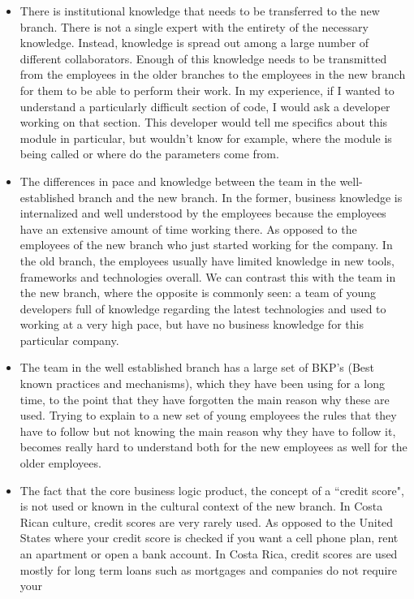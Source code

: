 \documentclass[12pt, letterpaper]{article}
\begin{document}
\begin{itemize}
  \item There is institutional knowledge that needs to be transferred to the new branch. There is not a single expert with  the 		  entirety of the necessary knowledge. Instead, knowledge is spread out among a 
  large number of different collaborators. Enough of this knowledge needs to be transmitted from the employees in the 
  older branches to the employees in the new 
  branch for them to be able to perform their work. In my experience, if I wanted to understand a particularly difficult
  section of code, I would ask a developer working on that section. This developer would tell me specifics about this 
  module in particular, but wouldn't know for example, where the module is being called or where do the parameters come
  from.
  \item The differences in pace and knowledge between the team in the well-established branch and the new branch.
  In the former, business knowledge is internalized and well understood by the employees 
  because the employees have an extensive amount of time working there. As opposed to the employees of the new
  branch who just started working for the company. 
  In the old branch, the employees usually have limited knowledge in new tools, 
  frameworks and technologies overall. We can contrast this with the team in the new branch, where the opposite is
  commonly seen: a team of young developers full of knowledge regarding the latest technologies and used to working at a 
  very high pace, but have no business knowledge for this particular company. 
  \item The team in the well established branch has a large set of BKP's (Best known practices and mechanisms), 
  which they have been using for a long time, to the point that they have forgotten the main reason
  why these are used. Trying to explain to a new set of young employees the rules that they have to follow but not
  knowing the main reason why they have to follow it, becomes really hard to understand both for the new employees
  as well for the older employees.
  \item The fact that the core business logic product, the concept of a ``credit score", is not used or known in the 
  cultural context of the new branch. In Costa Rican culture, credit scores are very rarely used. As opposed to the 
  United States where your credit score is checked if you want a cell phone plan, rent an apartment or open a bank account.
  In Costa Rica, credit scores are used mostly for long term loans such as mortgages and companies do not require your

\end{itemize}
\end{document}

